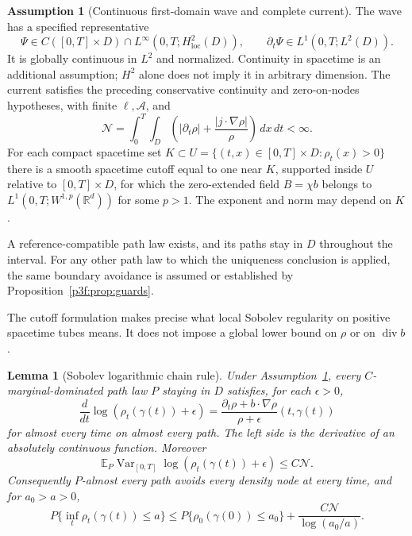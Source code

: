 \documentclass[11pt]{article}
\numberwithin{equation}{section}
\newtheorem{lemma}[theorem]{Lemma}
\theoremstyle{definition}
\newtheorem{assumption}[theorem]{Assumption}
\theoremstyle{remark}
\begin{document}
\begin{assumption}[Continuous first-domain wave and complete current]
\label{p3f:ass:central}
The wave has a specified representative
\[
 \Psi\in C([0,T]\times D)
          \cap L^\infty(0,T;H^2_{\mathrm{loc}}(D)),
 \qquad \partial_t\Psi\in L^1(0,T;L^2(D)).
\]
It is globally continuous in $L^2$ and normalized. Continuity in
spacetime is an additional assumption; $H^2$ alone does not imply it
in arbitrary dimension. The current satisfies the preceding
conservative continuity and zero-on-nodes hypotheses, with finite
$\ell,\mathcal A$, and
\begin{equation}\label{p3f:eq:logcost}
 \mathcal N=\int_0^T\!\int_D
 \left(|\partial_t\rho|
        +\frac{|j\cdot\nabla\rho|}{\rho}\right)\,dx\,dt<\infty.
\end{equation}
For each compact spacetime set
$K\subset U=\{(t,x)\in[0,T]\times D:\rho_t(x)>0\}$ there is a smooth
spacetime cutoff equal to one near $K$, supported inside $U$ relative
to $[0,T]\times D$, for which the zero-extended field
$B=\chi b$ belongs to
$L^1(0,T;W^{1,p}(\mathbb R^d))$ for some $p>1$.
The exponent and norm may depend on $K$.

A reference-compatible path law exists, and its paths stay in $D$
throughout the interval. For any other path law to which the
uniqueness conclusion is applied, the same boundary avoidance is
assumed or established by Proposition~\ref{p3f:prop:guards}.
\end{assumption}

The cutoff formulation makes precise what local Sobolev regularity on
positive spacetime tubes means. It does not impose a global lower
bound on $\rho$ or on $\operatorname{div}b$.

\begin{lemma}[Sobolev logarithmic chain rule]\label{p3f:lem:chain}
Under Assumption~\ref{p3f:ass:central}, every
$C$-marginal-dominated path law $P$ staying in $D$ satisfies, for each
$\epsilon>0$,
\begin{equation}\label{p3f:eq:logchain}
 \frac{d}{dt}\log(\rho_t(\gamma(t))+\epsilon)
 =\frac{\partial_t\rho+
                b\cdot\nabla\rho}{\rho+\epsilon}(t,\gamma(t))
\end{equation}
for almost every time on almost every path. The left side is the
derivative of an absolutely continuous function. Moreover
\begin{equation}\label{p3f:eq:logvariation}
 \mathbb E_P\operatorname{Var}_{[0,T]}
                 \log(\rho_t(\gamma(t))+\epsilon)
 \leq C\mathcal N.
\end{equation}
Consequently $P$-almost every path avoids every density node at every
time, and for $a_0>a>0$,
\begin{equation}\label{p3f:eq:nodeguard}
 P\{\inf_t\rho_t(\gamma(t))\leq a\}
 \leq P\{\rho_0(\gamma(0))\leq a_0\}
                           +\frac{C\mathcal N}{\log(a_0/a)}.
\end{equation}
\end{lemma}
\end{document}
